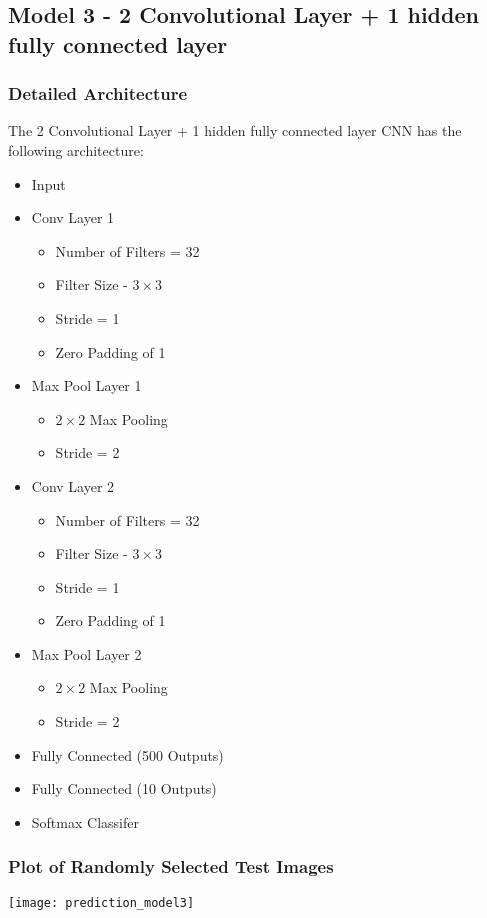 \documentclass[a4paper]{article}
\begin{document}
\subsection{Model 3 - 2 Convolutional Layer + 1 hidden fully connected layer }
\subsubsection{Detailed Architecture}
The 2 Convolutional Layer + 1 hidden fully connected layer  CNN has the following architecture:
\begin{itemize}
\item Input
\item Conv Layer 1
	\begin{itemize}
	\item Number of Filters = 32
	\item Filter Size - $3 \times 3$
    \item Stride = 1
    \item Zero Padding of 1
	\end{itemize}
\item Max Pool Layer 1
\begin{itemize}
\item $2\times2$ Max Pooling
\item Stride = 2
\end{itemize}
\item Conv Layer 2
	\begin{itemize}
	\item Number of Filters = 32
	\item Filter Size - $3 \times 3$
    \item Stride = 1
    \item Zero Padding of 1
	\end{itemize}
\item Max Pool Layer 2
\begin{itemize}
\item $2\times2$ Max Pooling
\item Stride = 2
\end{itemize}
\item Fully Connected (500 Outputs)
\item Fully Connected (10 Outputs)
\item Softmax Classifer
\end{itemize}
\subsubsection{Plot of Randomly Selected Test Images}
\texttt{[image: prediction\_model3]}
\end{document}
